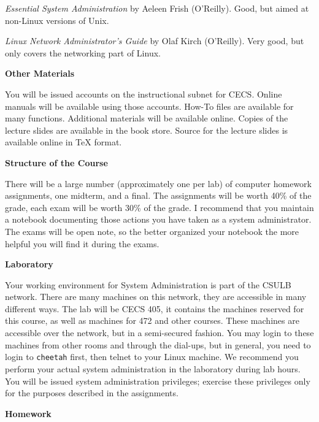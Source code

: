 
{\it Essential System Administration} by Aeleen Frish (O'Reilly).
Good, but aimed at non-Linux versions of Unix.

{\it Linux Network Administrator's Guide} by Olaf Kirch (O'Reilly).
Very good, but only covers the networking part of Linux.

\vskip 5pt
\centerline{\bf Other Materials}

You will be issued accounts on the instructional subnet for CECS.
Online manuals will be available using those accounts.
How-To files are available for many functions.
Additional materials will be available online.
Copies of the lecture slides are available in the book store.
Source for the lecture slides is available online in TeX format.

\vskip 5pt
\centerline{\bf Structure of the Course}
 
There will be a large number (approximately one per lab) of computer 
homework assignments, one midterm, and a final.
The assignments will be worth 40\% of the grade,
each exam will be worth 30\% of the grade.
I recommend that you maintain a notebook documenting those actions
you have taken as a system administrator.
The exams will be open note, so the better organized your notebook
the more helpful you will find it during the exams.

\vskip 5pt
\centerline{\bf Laboratory}

Your working environment for System Administration is part of the CSULB network.
There are many machines on this network, they are accessible in
many different ways.
The lab will be CECS 405, it contains the machines reserved for this course,
as well as machines for 472 and other courses.
These machines are accessible over the network,
but in a semi-secured fashion.
You may login to these machines from other rooms
and through the dial-ups, but in general, you need to login to {\tt cheetah}
first, then telnet to your Linux machine.
We recommend you perform your actual system administration in the laboratory
during lab hours.
You will be issued system administration privileges;
exercise these privileges only for the purposes described in the assignments.

\vfill\eject
\centerline{\bf Homework}


